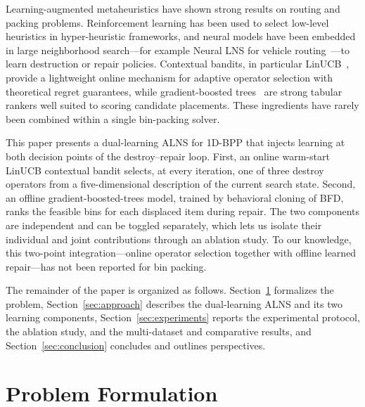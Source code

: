 \documentclass[conference]{IEEEtran}
\begin{document}
Learning-augmented metaheuristics have shown strong results on routing and
packing problems. Reinforcement learning has been used to select low-level
heuristics in hyper-heuristic frameworks, and neural models have been embedded in
large neighborhood search---for example Neural LNS for vehicle
routing~\cite{bHottung}---to learn destruction or repair policies. Contextual
bandits, in particular LinUCB~\cite{bLi,bChu}, provide a lightweight online
mechanism for adaptive operator selection with theoretical regret guarantees,
while gradient-boosted trees~\cite{bFriedman} are strong tabular rankers
well suited to scoring candidate placements. These ingredients have rarely been
combined within a single bin-packing solver.

This paper presents a dual-learning ALNS for 1D-BPP that injects learning at both
decision points of the destroy--repair loop. First, an online warm-start LinUCB
contextual bandit selects, at every iteration, one of three destroy operators
from a five-dimensional description of the current search state. Second, an
offline gradient-boosted-trees model, trained by behavioral cloning of BFD, ranks
the feasible bins for each displaced item during repair. The two components are
independent and can be toggled separately, which lets us isolate their individual
and joint contributions through an ablation study. To our knowledge, this
two-point integration---online operator selection together with offline learned
repair---has not been reported for bin packing.

The remainder of the paper is organized as follows.
Section~\ref{sec:formulation} formalizes the problem,
Section~\ref{sec:approach} describes the dual-learning ALNS and its two learning
components, Section~\ref{sec:experiments} reports the experimental protocol, the
ablation study, and the multi-dataset and comparative results, and
Section~\ref{sec:conclusion} concludes and outlines perspectives.

\section{Problem Formulation}\label{sec:formulation}
\end{document}
